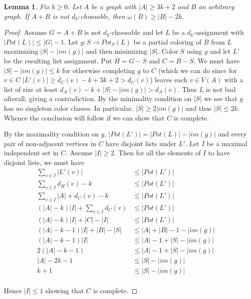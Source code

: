 \documentclass[12pt]{article}
\theoremstyle{plain}
\newtheorem{lem}[thm]{Lemma}
\theoremstyle{definition}
\theoremstyle{remark}
\begin{document}
\begin{lem}\label{ArbitraryJoin}
Fix $k \geq 0$.  Let $A$ be a graph with $|A| \geq 3k+2$ and $B$ an arbitrary graph.  If $A+B$ is not $d_k$-choosable, then
$\omega(B) \geq |B| - 2k$.
\end{lem}
\begin{proof}
Assume $G = A+B$ is not $d_k$-choosable and let $L$ be a $d_k$-assignment with $|Pot(L)| \leq |G| - 1$.  
Let $g:S \rightarrow Pot_S(L)$ be a partial coloring of $B$ from $L$ maximizing $|S| - |im(g)|$ and then
minimizing $|S|$.  Color $S$ using $g$ and let $L'$ be the resulting list assignment.
Put $H = G - S$ and $C = B - S$. We must have $|S| - |im(g)| \leq k$ for otherwise
completing $g$ to $C$ (which we can do since for $v \in C$ $|L'(v)| \geq d_C(v) - k + 3k+2 > d_C(v)$) leaves 
each $v \in V(A)$ with a list of size at least $d_A(v) - k + |S| - |im(g)| > d_A(v)$.  Thus $L$ is not bad afterall, giving 
a contradiction.  By the minimality condition on $|S|$ we see that $g$ has no singleton color classes.  In particular,
$|S| \geq 2|im(g)|$ and thus $|S| \leq 2k$.  Whence the conclusion will follow if we can show that $C$ is complete.\newline

By the maximality condition on $g$, $|Pot(L')| = |Pot(L)| - |im(g)|$ and 
every pair of non-adjacent vertices in $C$ have disjoint lists under $L'$.  
Let $I$ be a maximal independent set in $C$.  Assume $|I| \geq 2$.
Then for all the elements of $I$ to have disjoint lists, we must have
\begin{align*}
 \sum_{v \in I} |L'(v)| &\leq |Pot(L')| \\
 \sum_{v \in I} d_H(v) - k &\leq |Pot(L')| \\
 \sum_{v \in I} |A| + d_C(v) - k &\leq |Pot(L')| \\
 (|A|-k)|I| + \sum_{v \in I} d_C(v) &\leq |Pot(L')| \\
 (|A|-k)|I| + |C| - |I| &\leq |Pot(L')| \\
 (|A| - k - 1)|I| + |B| - |S|&\leq |A| + |B| - 1 - |im(g)| \\
 (|A| - k - 1)|I| &\leq |A| - 1 + |S| - |im(g)| \\
 2(|A| - k - 1) &\leq |A| - 1 + |S| - |im(g)| \\
 |A| - 2k - 1 &\leq |S| - |im(g)| \\
 k + 1 &\leq |S| - |im(g)| \\
\end{align*}

Hence $|I| \leq 1$ showing that $C$ is complete.
\end{proof}
\end{document}
